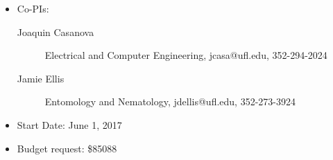 
\begin{itemize}
\item Co-PIs:
\begin{description}
\item[Joaquin Casanova] Electrical and Computer Engineering, jcasa@ufl.edu, 352-294-2024
\item[Jamie Ellis] Entomology and Nematology, jdellis@ufl.edu, 352-273-3924
\end{description}
\item Start Date: June 1, 2017
\item Budget request: \$85088
\end{itemize}

